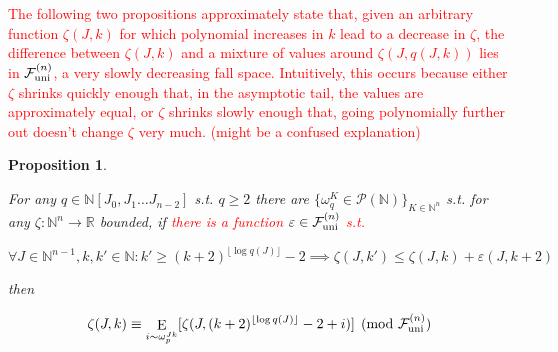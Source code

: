 \documentclass[11pt]{article}
\numberwithin{equation}{section}
\theoremstyle{definition}
\theoremstyle{plain}
\newtheorem{proposition}{Proposition}[section]
\DeclareMathOperator{\E}{E}
\newcommand{\Nats}{\mathbb{N}}
\newcommand{\Reals}{\mathbb{R}}
\newcommand{\NatPolyJ}{\Nats[J_0, J_1 \ldots J_{n-2}]}
\newcommand{\NatFun}{\Nats^n \rightarrow}
\newcommand{\Floor}[1]{\lfloor #1 \rfloor}
\newcommand{\Fall}{\mathcal{F}}
\newcommand{\FallU}{{\Fall_{\textnormal{uni}}^{(n)}}}
\begin{document}
\begin{samepage}

\textcolor{red}{The following two propositions approximately state that, given an arbitrary function $\zeta(J,k)$ for which polynomial increases in $k$ lead to a decrease in $\zeta$, the difference between $\zeta(J,k)$ and a mixture of values around $\zeta(J,q(J,k))$ lies in $\FallU$, a very slowly decreasing fall space. Intuitively, this occurs because either $\zeta$ shrinks quickly enough that, in the asymptotic tail, the values are approximately equal, or $\zeta$ shrinks slowly enough that, going polynomially further out doesn't change $\zeta$ very much. (might be a confused explanation)}

\begin{proposition}
\label{prp:fall_uni_weak}

For any ${q \in \NatPolyJ}$ s.t. ${q \geq 2}$ there are ${\{\omega_q^K \in \mathcal{P}(\Nats)\}_{K \in \Nats^n}}$ s.t. for any ${\zeta: \NatFun \Reals}$ bounded, if \textcolor{red}{there is a function $\varepsilon\in\FallU$ s.t.}

\begin{equation}
\label{eqn:prp__fall_uni_weak__prem}
\forall J \in \Nats^{n-1}, k,k' \in \Nats: k' \geq (k+2)^{\Floor{\log q(J)}}-2 \implies \zeta(J,k') \leq \zeta(J,k)+\varepsilon(J,k+2)
\end{equation}

then

\begin{equation}
\label{eqn:prp__fall_uni_weak__conc}
\zeta(J,k) \equiv \E_{i \sim \omega_p^{Jk}}[\zeta(J,(k+2)^{\Floor{\log q(J)}}-2+i)] \pmod \FallU
\end{equation}

\end{proposition}
\end{samepage}
\end{document}
